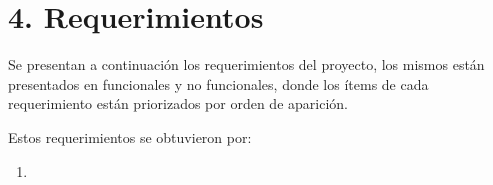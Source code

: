 \section{4. Requerimientos}
\label{sec:requerimientos}

Se presentan a continuación los requerimientos del proyecto, los mismos están presentados en funcionales y no funcionales, donde los ítems de cada requerimiento están priorizados por orden de aparición.

Estos requerimientos se obtuvieron por:

\begin{enumerate}
\item 
		
\end{enumerate}